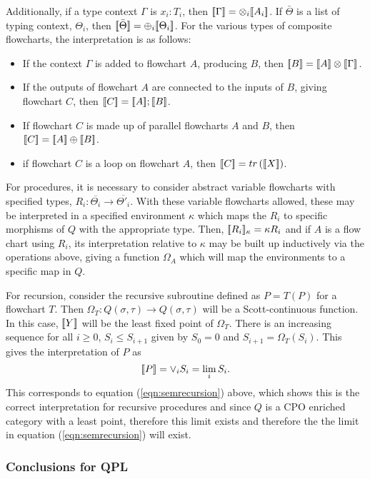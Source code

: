 Additionally, if a type context $\Gamma$ is $x_{i}:T_{i}$, then
$[\![\Gamma]\!]=\otimes_{i}[\![A_{i}]\!]$. If $\bar{\Theta}$ is a list of typing context,
$\Theta_{i}$, then $[\![\bar{\Theta}]\!] = \oplus_{i}[\![\Theta_{i}]\!]$. For the various types of
composite flowcharts, the interpretation is as follows:
\begin{itemize}
  \item If the context $\Gamma$ is added to flowchart $A$, producing $B$, then
    $[\![B]\!] = [\![A]\!]\otimes[\![\Gamma]\!]$.
  \item If the outputs of flowchart $A$ are connected to the inputs of $B$, giving flowchart $C$,
    then $[\![C]\!]=[\![A]\!] ; [\![B]\!]$.
  \item If flowchart $C$ is made up of parallel flowcharts $A$ and $B$, then
    $[\![C]\!] = [\![A]\!]\oplus[\![B]\!]$.
  \item if flowchart $C$ is a loop on flowchart $A$, then $[\![C]\!] = tr\,([\![X]\!])$.
\end{itemize}

For procedures, it is necessary to consider abstract variable flowcharts with specified types,
$R_{i}:\overline{\Theta_{i}} \to \overline{\Theta'_{i}}$. With these variable flowcharts allowed,
these may be interpreted in a specified environment $\kappa$ which maps the $R_{i}$ to specific
morphisms of $Q$ with the appropriate type. Then, $[\![R_{i}]\!]_{\kappa} = \kappa{R_{i}}$ and if
$A$ is a flow chart using $R_{i}$, its interpretation relative to $\kappa$ may be built up
inductively via the operations above, giving a function $\Omega_{A}$ which will map the
environments to a specific map in $Q$.

For recursion, consider the recursive subroutine defined as $P=T(P)$ for a flowchart $T$. Then
$\Omega_{T}:Q(\sigma,\tau)\to Q(\sigma,\tau)$ will be a Scott-continuous function. In this case,
$[\![Y]\!]$ will be the least fixed point of $\Omega_{T}$. There is an increasing sequence for all
$i\ge0$, $S_{i} \le S_{i+1}$ given by $S_{0} = 0$ and $S_{i+1} = \Omega_{T}(S_{i})$. This gives the
interpretation of $P$ as \[[\![P]\!] = \vee_{i} S_{i} = \lim_{i} S_{i}.\] This corresponds to
equation (\ref{eqn:semrecursion}) above, which shows this is the correct interpretation for
recursive procedures and since $Q$ is a CPO enriched category with a least point, therefore this
limit exists and therefore the the limit in equation (\ref{eqn:semrecursion}) will exist.


\subsubsection{Conclusions for QPL}\label{sec:conclusionsqpl}
